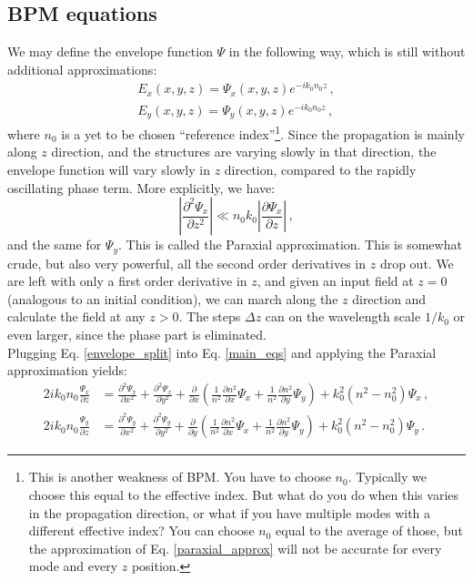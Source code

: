 \documentclass[]{article}
\begin{document}
	\subsection{BPM equations}
	We may define the envelope function $\Psi$ in the following way, which is still without additional approximations:
	\begin{subequations}
		\begin{align}
			E_x(x,y,z) = \Psi_x(x,y,z) e^{-ik_0 n_0 z}\, ,\\
			E_y(x,y,z) = \Psi_y(x,y,z) e^{-ik_0 n_0 z}\, ,
		\end{align}
		\label{envelope_split}
	\end{subequations}
	where $n_0$ is a yet to be chosen ``reference index''\footnote{This is another weakness of BPM. You have to choose $n_0$. Typically we choose this equal to the effective index. But what do you do when this varies in the propagation direction, or what if you have multiple modes with a different effective index? You can choose $n_0$ equal to the average of those, but the approximation of Eq. \eqref{paraxial_approx} will not be accurate for every mode and every $z$ position.}. 
	Since the propagation is mainly along $z$ direction, and the structures are varying slowly in that direction, the envelope function will vary slowly in $z$ direction, compared to the rapidly oscillating phase term. More explicitly,
	we have:
	\begin{equation}
		\left|\frac{\partial^2 \Psi_x}{\partial z^2} \right| \ll n_0 k_0 \left| \frac{\partial \Psi_x}{\partial z} \right|\, ,
		\label{paraxial_approx}
	\end{equation}
	and the same for $\Psi_y$. This is called the Paraxial approximation. This is somewhat crude, but also very powerful, all the second order derivatives in $z$ drop out. We are left with only a first order derivative in $z$, and given an input field at $z=0$ (analogous to an initial condition), we can march along the $z$ direction and calculate the field at any $z>0$. The steps $\Delta z$ can on the wavelength scale $1/k_0$ or even larger, since the phase part is eliminated.\\
	
	Plugging Eq. \eqref{envelope_split} into Eq. \eqref{main_eqs} and applying the Paraxial approximation yields:
	\begin{subequations}
		\begin{align}
			2i k_0 n_0 \frac{\Psi_x}{\partial z} &= \frac{\partial^2\Psi_x}{\partial x^2}+\frac{\partial^2\Psi_x}{\partial y^2}+\frac{\partial}{\partial x}\left(\frac{1}{n^2}\frac{\partial n^2}{\partial x} \Psi_x+\frac{1}{n^2}\frac{\partial n^2}{\partial y} \Psi_y \right)+k_0^2(n^2-n_0^2)\Psi_x \, ,\\
			2i k_0 n_0 \frac{\Psi_y}{\partial z} &= \frac{\partial^2\Psi_y}{\partial x^2}+\frac{\partial^2\Psi_y}{\partial y^2}+\frac{\partial}{\partial y}\left(\frac{1}{n^2}\frac{\partial n^2}{\partial x} \Psi_x+\frac{1}{n^2}\frac{\partial n^2}{\partial y} \Psi_y \right)+k_0^2(n^2-n_0^2)\Psi_y  \, .
		\end{align}
	\end{subequations}
	
\end{document}
